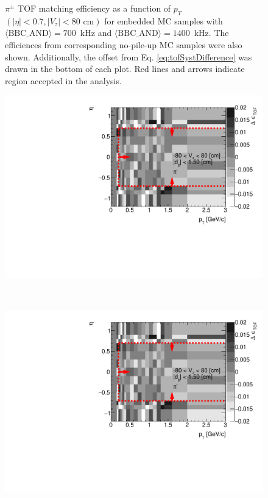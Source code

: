\begin{figure}[hb]
{	}%
	\caption[$\pi^\pm$ TOF matching efficiency as a function of $p_T$ $\left(|\eta|<0.7, |V_z|<80\text{ cm}\right)$ for embedded MC samples with \mbox{$\langle\text{BBC\_AND}\rangle=700$~kHz} and \mbox{$\langle\text{BBC\_AND}\rangle=1400$~kHz}]{$\pi^\pm$ TOF matching efficiency as a function of $p_T$ $\left(|\eta|<0.7, |V_z|<80\text{ cm}\right)$ for embedded MC samples with \mbox{$\langle\text{BBC\_AND}\rangle=700$~kHz} and \mbox{$\langle\text{BBC\_AND}\rangle=1400$~kHz}. The efficiences from corresponding no-pile-up MC samples were also shown. Additionally, the offset  from Eq. \ref{eq:tofSystDifference} was drawn in the bottom of each plot. Red lines and arrows indicate region accepted in the analysis.}
	\label{fig:systError1Dtof}
\end{figure}
\begin{figure}[H]
	\centering
	\parbox{0.495\textwidth}{
		\centering
		\includegraphics[width=\linewidth,page=1]{graphics/systematicsEfficiency/bbc_and/tofEffi_d0_1_5_etapt_12D.pdf}\\
	}~
	\parbox{0.495\textwidth}{
		\centering
		\includegraphics[width=\linewidth,page=2]{graphics/systematicsEfficiency/bbc_and/tofEffi_d0_1_5_etapt_12D.pdf}\\
}
\end{figure}
